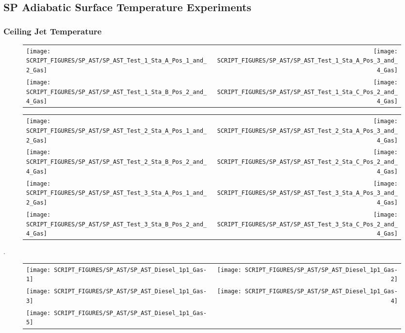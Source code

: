 \clearpage


\subsection{SP Adiabatic Surface Temperature Experiments}

\subsubsection{Ceiling Jet Temperature}

\begin{figure}[h!]
\begin{tabular*}{\textwidth}{l@{\extracolsep{\fill}}r}
\texttt{[image: SCRIPT\_FIGURES/SP\_AST/SP\_AST\_Test\_1\_Sta\_A\_Pos\_1\_and\_2\_Gas]} &
\texttt{[image: SCRIPT\_FIGURES/SP\_AST/SP\_AST\_Test\_1\_Sta\_A\_Pos\_3\_and\_4\_Gas]} \\
\texttt{[image: SCRIPT\_FIGURES/SP\_AST/SP\_AST\_Test\_1\_Sta\_B\_Pos\_2\_and\_4\_Gas]} &
\texttt{[image: SCRIPT\_FIGURES/SP\_AST/SP\_AST\_Test\_1\_Sta\_C\_Pos\_2\_and\_4\_Gas]}
\end{tabular*}
\label{SP_Test_1_Gas}
\end{figure}

\newpage

\begin{figure}[!ht]
\begin{tabular*}{\textwidth}{l@{\extracolsep{\fill}}r}
\texttt{[image: SCRIPT\_FIGURES/SP\_AST/SP\_AST\_Test\_2\_Sta\_A\_Pos\_1\_and\_2\_Gas]} &
\texttt{[image: SCRIPT\_FIGURES/SP\_AST/SP\_AST\_Test\_2\_Sta\_A\_Pos\_3\_and\_4\_Gas]} \\
\texttt{[image: SCRIPT\_FIGURES/SP\_AST/SP\_AST\_Test\_2\_Sta\_B\_Pos\_2\_and\_4\_Gas]} &
\texttt{[image: SCRIPT\_FIGURES/SP\_AST/SP\_AST\_Test\_2\_Sta\_C\_Pos\_2\_and\_4\_Gas]} \\
\texttt{[image: SCRIPT\_FIGURES/SP\_AST/SP\_AST\_Test\_3\_Sta\_A\_Pos\_1\_and\_2\_Gas]} &
\texttt{[image: SCRIPT\_FIGURES/SP\_AST/SP\_AST\_Test\_3\_Sta\_A\_Pos\_3\_and\_4\_Gas]} \\
\texttt{[image: SCRIPT\_FIGURES/SP\_AST/SP\_AST\_Test\_3\_Sta\_B\_Pos\_2\_and\_4\_Gas]} &
\texttt{[image: SCRIPT\_FIGURES/SP\_AST/SP\_AST\_Test\_3\_Sta\_C\_Pos\_2\_and\_4\_Gas]}
\end{tabular*}
\label{SP_Test_2_3_Gas}
\end{figure}

\clearpage.

\begin{figure}[h!]
\begin{tabular*}{\textwidth}{l@{\extracolsep{\fill}}r}
\texttt{[image: SCRIPT\_FIGURES/SP\_AST/SP\_AST\_Diesel\_1p1\_Gas-1]}   &  \texttt{[image: SCRIPT\_FIGURES/SP\_AST/SP\_AST\_Diesel\_1p1\_Gas-2]}    \\
\texttt{[image: SCRIPT\_FIGURES/SP\_AST/SP\_AST\_Diesel\_1p1\_Gas-3]}   &  \texttt{[image: SCRIPT\_FIGURES/SP\_AST/SP\_AST\_Diesel\_1p1\_Gas-4]}     \\
\texttt{[image: SCRIPT\_FIGURES/SP\_AST/SP\_AST\_Diesel\_1p1\_Gas-5]}   &
\end{tabular*}
\label{SP_Diesel_1p1_Gas}
\end{figure}


